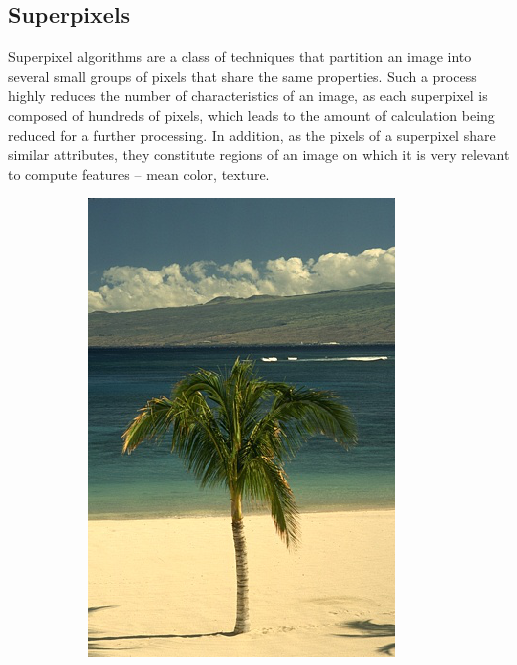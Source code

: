 \documentclass{article}
\begin{document}
    \subsection{Superpixels}
        Superpixel algorithms are a class of techniques that partition an image into several small groups of pixels that share the same properties. Such a process highly reduces the number of characteristics of an image, as each superpixel is composed of hundreds of pixels, which leads to the amount of calculation being reduced for a further processing. In addition, as the pixels of a superpixel share similar attributes, they constitute regions of an image on which it is very relevant to compute features -- mean color, texture.

        \begin{figure}[!ht]
        \centering
        \begin{subfigure}{.3\linewidth}
            \centering
            \includegraphics[width=0.9\linewidth]{pics/img_spp1.png}

\end{subfigure}
\end{figure}
\end{document}
